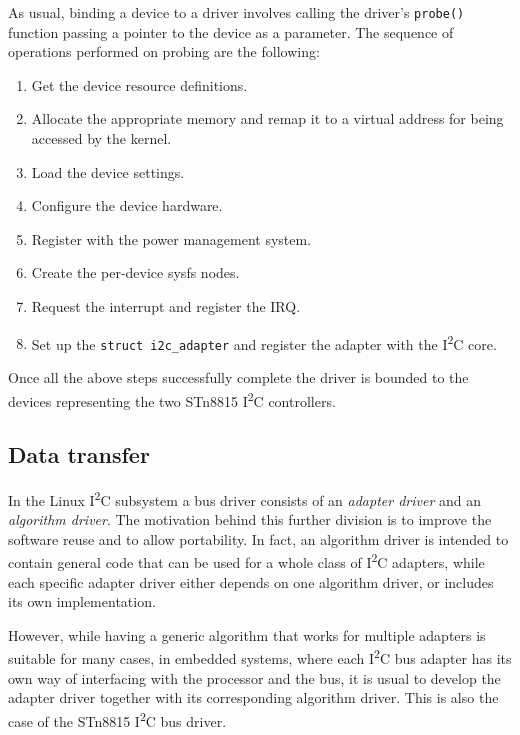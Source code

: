 \documentclass[a4paper,10pt]{article}
\newenvironment{packedenum}{
\begin{enumerate}
  \setlength{\itemsep}{3pt}
  \setlength{\parskip}{0pt}
  \setlength{\parsep}{0pt}
}{\end{enumerate}}
\newcommand{\iic}{I\textsuperscript{2}C }
\newcommand{\keyword}[1]{\texttt{#1}}
\begin{document}
\begin{multicols}{2}
As usual, binding a device to a driver involves calling the driver's 
\keyword{probe()} function passing a pointer to the device as a parameter.
The sequence of operations performed on probing are the following:
\begin{packedenum}
	\item Get the device resource definitions.
	\item Allocate the appropriate memory and remap it to a virtual address
		for being accessed by the kernel.
	\item Load the device settings.
	\item Configure the device hardware.
	\item Register with the power management system.
	\item Create the per-device sysfs nodes.
	\item Request the interrupt and	register the IRQ.
	\item Set up the \keyword{struct i2c\_adapter} and register the adapter
		with the \iic core.
\end{packedenum}

Once all the above steps successfully complete the driver is bounded to the
devices representing the two STn8815 \iic controllers.


\subsection{Data transfer}
\label{sec:adapter_data_transfer}

In the Linux \iic subsystem a bus driver consists of an \emph{adapter driver}
and an \emph{algorithm driver}. The motivation behind this further division is
to improve the software reuse and to allow portability. In fact, an algorithm
driver is intended to contain general code that can be used for a whole class
of \iic adapters, while each specific adapter driver either depends on one
algorithm driver, or includes its own implementation.

However, while having a generic algorithm that works for multiple adapters is
suitable for many cases, in embedded systems, where each \iic bus
adapter has its own way of interfacing with the processor and the bus,
it is usual to develop the adapter driver together with its corresponding
algorithm driver. This is also the case of the STn8815 \iic bus driver.


\end{multicols}
\end{document}
